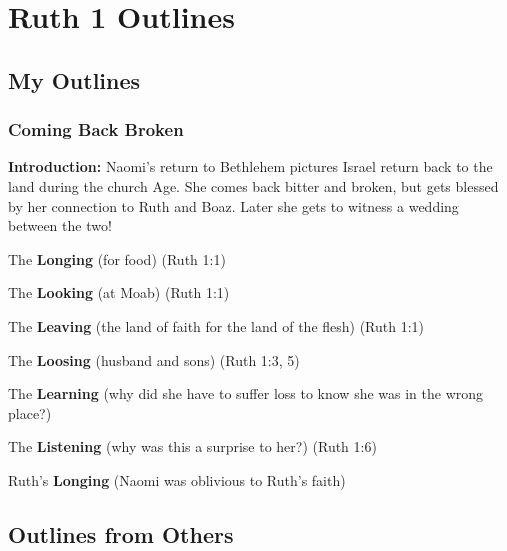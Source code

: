 \section{Ruth 1 Outlines}


\subsection{My Outlines}

\subsubsection{Coming Back Broken}
\textbf{Introduction: }Naomi's return to Bethlehem pictures Israel return back to the land during the church Age. She comes back bitter and broken, but gets blessed by her connection to Ruth and Boaz. Later she gets to witness a wedding between the two!
\begin{compactenum}[I.][7]
    \item The \textbf{Longing} (for food) (Ruth 1:1)
    \item The \textbf{Looking} (at Moab) (Ruth 1:1)
    \item The \textbf{Leaving} (the land of faith for the land of the flesh) (Ruth 1:1)
    \item The \textbf{Loosing} (husband and sons) (Ruth 1:3, 5)
    \item The \textbf{Learning} (why did she have to suffer loss to know she was in the wrong place?) 
    \item The \textbf{Listening} (why was this a surprise to her?)  (Ruth 1:6)
    \item Ruth's \textbf{Longing} (Naomi was oblivious to Ruth's faith)  %
\end{compactenum}


\subsection{Outlines from Others}


